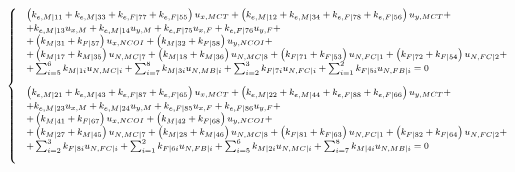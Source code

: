 \begin{equation}\label{paperA:eq:syseqs02}
\footnotesize
\begin{cases}
&\left(k_{e,M|11}+k_{e,M|33}+k_{e,F|77}+k_{e,F|55}\right)u_{x,MCT}+\left(k_{e,M|12}+k_{e,M|34}+k_{e,F|78}+k_{e,F|56}\right)u_{y,MCT}+\\&+k_{e,M|13}u_{x,M}+k_{e,M|14}u_{y,M}+k_{e,F|75}u_{x,F}+k_{e,F|76}u_{y,F}+\\&+\left(k_{M|31}+k_{F|57}\right)u_{x,NCOI}+\left(k_{M|32}+k_{F|58}\right)u_{y,NCOI}+\\&+\left(k_{M|17}+k_{M|35}\right)u_{N,MC|7}+\left(k_{M|18}+k_{M|36}\right)u_{N,MC|8}+\left(k_{F|71}+k_{F|53}\right)u_{N,FC|1}+\left(k_{F|72}+k_{F|54}\right)u_{N,FC|2}+\\&+\sum_{i=5}^{6}k_{M|1i}u_{N,MC|i}+\sum_{i=7}^{8}k_{M|3i}u_{N,MB|i}+\sum_{i=2}^{3}k_{F|7i}u_{N,FC|i}+\sum_{i=1}^{2}k_{F|5i}u_{N,FB|i}=0\\[10pt]
&\left(k_{e,M|21}+k_{e,M|43}+k_{e,F|87}+k_{e,F|65}\right)u_{x,MCT}+\left(k_{e,M|22}+k_{e,M|44}+k_{e,F|88}+k_{e,F|66}\right)u_{y,MCT}+\\&+k_{e,M|23}u_{x,M}+k_{e,M|24}u_{y,M}+k_{e,F|85}u_{x,F}+k_{e,F|86}u_{y,F}+\\&+\left(k_{M|41}+k_{F|67}\right)u_{x,NCOI}+\left(k_{M|42}+k_{F|68}\right)u_{y,NCOI}+\\&+\left(k_{M|27}+k_{M|45}\right)u_{N,MC|7}+\left(k_{M|28}+k_{M|46}\right)u_{N,MC|8}+\left(k_{F|81}+k_{F|63}\right)u_{N,FC|1}+\left(k_{F|82}+k_{F|64}\right)u_{N,FC|2}+\\&+\sum_{i=2}^{3}k_{F|8i}u_{N,FC|i}+\sum_{i=1}^{2}k_{F|6i}u_{N,FB|i}+\sum_{i=5}^{6}k_{M|2i}u_{N,MC|i}+\sum_{i=7}^{8}k_{M|4i}u_{N,MB|i}=0\\[10pt]
\end{cases}
\end{equation}

